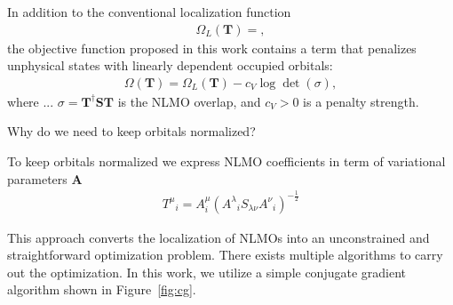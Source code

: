\documentclass[aps,prl,reprint,amsmath,amssymb]{revtex4-1}
\begin{document}
In addition to the conventional localization function
%
\begin{equation}
\begin{split}
\Omega_L (\mathbf{T}) = ,
\end{split}
\end{equation}
%
the objective function proposed in this work contains a term that penalizes unphysical states with linearly dependent occupied orbitals:
%
\begin{equation}
\begin{split}
\Omega(\mathbf{T}) = \Omega_L(\mathbf{T}) - c_V \log \det (\sigma),
\end{split}
\end{equation}
%
where ... $\sigma = \mathbf{T}^\dagger \mathbf{ S T}$ is the NLMO overlap, and $c_V > 0$ is a penalty strength.

Why do we need to keep orbitals normalized?

To keep orbitals normalized we express NLMO coefficients in term of variational parameters $\mathbf{A}$
%
\begin{equation}
\begin{split}
{T^{\mu}}_{i} = A^{\mu}_{i} ({A^{\lambda}}_{i} S_{\lambda\nu}{A^{\nu}}_{i})^{-\frac{1}{2}}
\end{split}
\end{equation}

This approach converts the localization of NLMOs into an unconstrained and straightforward optimization problem. There exists multiple algorithms to carry out the optimization. In this work, we utilize a simple conjugate gradient algorithm shown in Figure~\ref{fig:cg}.
\end{document}
